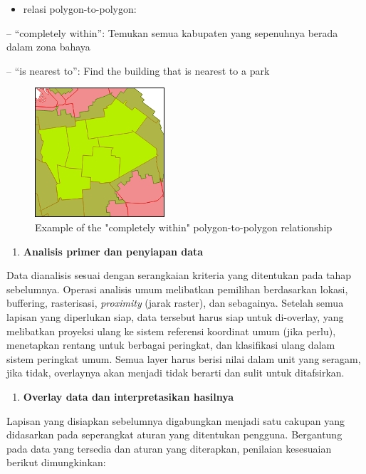 \documentclass[]{book}
\providecommand{\tightlist}{%
  \setlength{\itemsep}{0pt}\setlength{\parskip}{0pt}}
\begin{document}
\begin{itemize}
\tightlist
\item
  relasi polygon-to-polygon:
\end{itemize}

-- ``completely within'': Temukan semua kabupaten yang sepenuhnya berada dalam zona bahaya

-- ``is nearest to'': Find the building that is nearest to a park

\begin{figure}

{\centering \includegraphics[width=0.2\linewidth]{images/04/fig5} 

}

\caption{Example of the "completely within" polygon-to-polygon relationship}\label{fig:fig1405}
\end{figure}

\begin{enumerate}
\def\labelenumi{\arabic{enumi}.}
\setcounter{enumi}{3}
\tightlist
\item
  \textbf{Analisis primer dan penyiapan data}
\end{enumerate}

Data dianalisis sesuai dengan serangkaian kriteria yang ditentukan pada tahap sebelumnya. Operasi analisis umum melibatkan pemilihan berdasarkan lokasi, buffering, rasterisasi, \emph{proximity} (jarak raster), dan sebagainya. Setelah semua lapisan yang diperlukan siap, data tersebut harus siap untuk di-overlay, yang melibatkan proyeksi ulang ke sistem referensi koordinat umum (jika perlu), menetapkan rentang untuk berbagai peringkat, dan klasifikasi ulang dalam sistem peringkat umum. Semua layer harus berisi nilai dalam unit yang seragam, jika tidak, overlaynya akan menjadi tidak berarti dan sulit untuk ditafsirkan.

\begin{enumerate}
\def\labelenumi{\arabic{enumi}.}
\setcounter{enumi}{4}
\tightlist
\item
  \textbf{Overlay data dan interpretasikan hasilnya}
\end{enumerate}

Lapisan yang disiapkan sebelumnya digabungkan menjadi satu cakupan yang didasarkan pada seperangkat aturan yang ditentukan pengguna. Bergantung pada data yang tersedia dan aturan yang diterapkan, penilaian kesesuaian berikut dimungkinkan:
\end{document}
